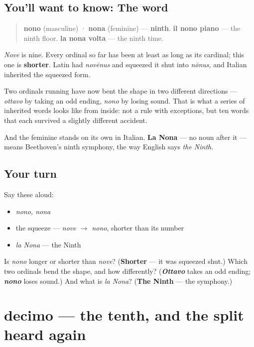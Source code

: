 \subsection*{You'll want to know: The word}
\begin{quote}
\textbf{nono} (masculine) · \textbf{nona} (feminine) — \textbf{ninth}. \textbf{il nono piano} — the ninth floor. \textbf{la nona volta} — the ninth time.
\end{quote}

\begin{cousinweb}
\emph{Nove} is nine. Every ordinal so far has been at least as long as its cardinal; this one is \textbf{shorter}. Latin had \emph{novēnus} and squeezed it shut into \emph{nōnus}, and Italian inherited the squeezed form.

Two ordinals running have now bent the shape in two different directions — \emph{ottavo} by taking an odd ending, \emph{nono} by losing sound. That is what a series of inherited words looks like from inside: not a rule with exceptions, but ten words that each survived a slightly different accident.

And the feminine stands on its own in Italian. \textbf{La Nona} — no noun after it — means Beethoven's ninth symphony, the way English says \emph{the Ninth}.
\end{cousinweb}

\subsection*{Your turn}
Say these aloud:

\begin{itemize}
\raggedright
  \item \emph{nono, nona}
  \item the squeeze — \emph{nove $\to$ nono}, shorter than its number
  \item \emph{la Nona} — the Ninth
\end{itemize}

\begin{tcolorbox}[breakable,colback=teal!4,colframe=teal!35!black,title={Before you move on}]
Is \emph{nono} longer or shorter than \emph{nove}? (\textbf{Shorter} — it was squeezed shut.) Which two ordinals bend the shape, and how differently? (\emph{\textbf{Ottavo}} takes an odd ending; \emph{\textbf{nono}} loses sound.) And what is \emph{la Nona}? (\textbf{The Ninth} — the symphony.)
\end{tcolorbox}
\section[decimo / decima]{decimo — the tenth, and the split heard again}

